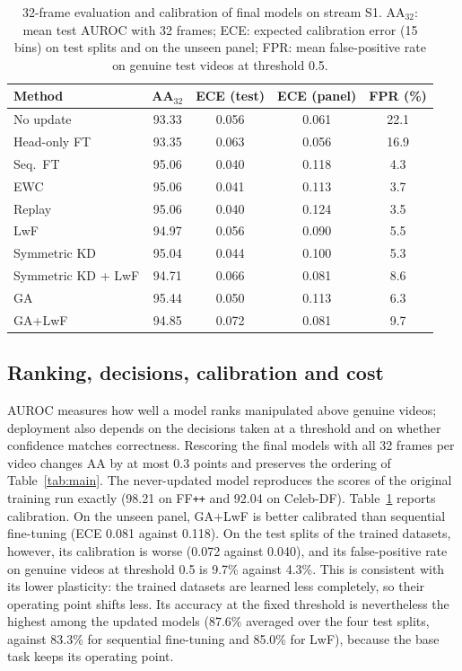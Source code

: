 \documentclass[journal]{IEEEtran}
\newcommand{\ffpp}{FF\texttt{++}}
\begin{document}
\begin{table}[t]
\caption{32-frame evaluation and calibration of final models on stream S1. AA$_{32}$: mean test AUROC with 32 frames; ECE: expected calibration error (15 bins) on test splits and on the unseen panel; FPR: mean false-positive rate on genuine test videos at threshold 0.5.}
\label{tab:calib}
\centering
\footnotesize
\setlength{\tabcolsep}{3.5pt}
\begin{tabular}{@{}lcccc@{}}
\toprule
Method & AA$_{32}$ & ECE (test) & ECE (panel) & FPR (\%) \\
\midrule
No update & 93.33 & 0.056 & 0.061 & 22.1 \\
Head-only FT & 93.35 & 0.063 & 0.056 & 16.9 \\
Seq.\ FT & 95.06 & 0.040 & 0.118 & 4.3 \\
EWC & 95.06 & 0.041 & 0.113 & 3.7 \\
Replay & 95.06 & 0.040 & 0.124 & 3.5 \\
LwF & 94.97 & 0.056 & 0.090 & 5.5 \\
Symmetric KD & 95.04 & 0.044 & 0.100 & 5.3 \\
Symmetric KD + LwF & 94.71 & 0.066 & 0.081 & 8.6 \\
GA & 95.44 & 0.050 & 0.113 & 6.3 \\
GA+LwF & 94.85 & 0.072 & 0.081 & 9.7 \\
\bottomrule
\end{tabular}
\end{table}

\subsection{Ranking, decisions, calibration and cost}
\label{sec:calib}
AUROC measures how well a model ranks manipulated above genuine videos; deployment also depends on the decisions taken at a threshold and on whether confidence matches correctness. Rescoring the final models with all 32 frames per video changes AA by at most 0.3 points and preserves the ordering of Table~\ref{tab:main}. The never-updated model reproduces the scores of the original training run exactly (98.21 on \ffpp{} and 92.04 on Celeb-DF). Table~\ref{tab:calib} reports calibration. On the unseen panel, GA+LwF is better calibrated than sequential fine-tuning (ECE 0.081 against 0.118). On the test splits of the trained datasets, however, its calibration is worse (0.072 against 0.040), and its false-positive rate on genuine videos at threshold 0.5 is 9.7\% against 4.3\%. This is consistent with its lower plasticity: the trained datasets are learned less completely, so their operating point shifts less. Its accuracy at the fixed threshold is nevertheless the highest among the updated models (87.6\% averaged over the four test splits, against 83.3\% for sequential fine-tuning and 85.0\% for LwF), because the base task keeps its operating point.
\end{document}
